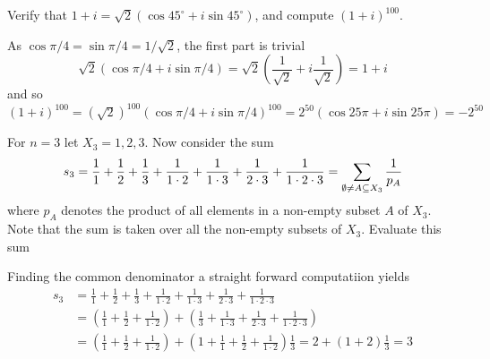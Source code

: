 \documentclass[a4paper, english, 12pt]{article} %
\begin{document}
\begin{subproblem}
  Verify that $1 + i = \sqrt{2}(\cos 45^\circ + i \sin 45^\circ)$, and compute $(1+i)^{100}$.
\end{subproblem}

\begin{answer}
  As $\cos \pi/4 = \sin \pi/4 = 1/\sqrt{2}$, the first part is trivial
  \begin{equation*}
    \sqrt{2}( \cos \pi/4 + i \sin \pi/4) = \sqrt{2}\left( \frac{1}{\sqrt{2}} + i \frac{1}{\sqrt{2}} \right) = 1 + i
  \end{equation*}
  and so $(1+i)^{100} = (\sqrt{2})^{100}(\cos \pi/4 + i\sin \pi/4)^{100} =
  2^{50}(\cos 25 \pi + i \sin 25 \pi) = -2^{50}$
\end{answer}

\begin{problem}[16]
  \begin{subproblem}
    \label{subprob:16a}
    For $n=3$ let $X_3 = {1,2,3}$. Now consider the sum
    \begin{equation*}
      s_3 = \frac{1}{1} + \frac{1}{2} + \frac{1}{3}
      + \frac{1}{1\cdot 2} + \frac{1}{ 1 \cdot 3} + \frac{1}{2 \cdot 3} + \frac{1}{1 \cdot 2 \cdot 3} \\
       = \sum_{\emptyset \neq A \subseteq X_3} \frac{1}{p_A}
     \end{equation*}
     where $p_A$ denotes the product of all elements in a non-empty subset $A$
     of $X_3$. Note that the sum is taken over all the non-empty subsets of
     $X_3$. Evaluate this sum
  \end{subproblem}
\end{problem}

\begin{answer}
  Finding the common denominator a straight forward computatiion yields
  \begin{align*}
      s_3 & = \frac{1}{1} + \frac{1}{2} + \frac{1}{3}
    + \frac{1}{1\cdot 2} + \frac{1}{ 1 \cdot 3} + \frac{1}{2 \cdot 3} + \frac{1}{1 \cdot 2 \cdot 3} \\
          & = \left(   \frac{1}{1} + \frac{1}{2} + \frac{1}{1 \cdot 2} \right)
            + \left(  \frac{1}{3} + \frac{1}{1\cdot 3} + \frac{1}{2 \cdot 3} + \frac{1}{1 \cdot 2 \cdot 3} \right)\\
          & = \left(   \frac{1}{1} + \frac{1}{2} + \frac{1}{1 \cdot 2} \right)
            + \left( 1 + \frac{1}{1} + \frac{1}{2} + \frac{1}{1 \cdot 2} \right)\frac{1}{3}
            = 2 + (1 + 2)\frac{1}{3} = 3
  \end{align*}
\end{answer}
\end{document}
